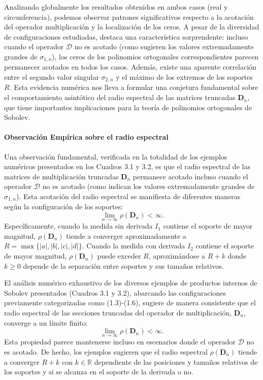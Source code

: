 Analizando globalmente los resultados obtenidos en ambos casos (real y circunferencia), podemos observar patrones significativos respecto a la acotación del operador multiplicación y la localización de los ceros. A pesar de la diversidad de configuraciones estudiadas, destaca una característica sorprendente: incluso cuando el operador $\mathcal{D}$ no es acotado (como sugieren los valores extremadamente grandes de $\sigma_{1,n}$), los ceros de los polinomios ortogonales correspondientes parecen permanecer acotados en todos los casos. Además, existe una aparente correlación entre el segundo valor singular $\sigma_{2,n}$ y el máximo de los extremos de los soportes $R$. Esta evidencia numérica nos lleva a formular una conjetura fundamental sobre el comportamiento asintótico del radio espectral de las matrices truncadas $\mathbf{D}_n$, que tiene importantes implicaciones para la teoría de polinomios ortogonales de Sobolev.

\paragraph{Observación Empírica sobre el radio espectral}
Una observación fundamental, verificada en la totalidad de los ejemplos numéricos presentados en los Cuadros 3.1 y 3.2, es que el radio espectral de las matrices de multiplicación truncadas $\mathbf{D}_n$ permanece acotado incluso cuando el operador $\mathcal{D}$ no es acotado (como indican los valores extremadamente grandes de $\sigma_{1,n}$). Esta acotación del radio espectral se manifiesta de diferentes maneras según la configuración de los soportes:
$$
	\lim_{n \to \infty} \rho(\mathbf{D}_n) < \infty.
$$
Específicamente, cuando la medida sin derivada $I_1$ contiene el soporte de mayor magnitud, $\rho(\mathbf{D}_n)$ tiende a converger aproximadamente a $R = \max\{|a|,|b|,|c|,|d|\}$. Cuando la medida con derivada $I_2$ contiene el soporte de mayor magnitud, $\rho(\mathbf{D}_n)$ puede exceder $R$, aproximándose a $R + k$ donde $k \geq 0$ depende de la separación entre soportes y sus tamaños relativos.

\begin{conjetura}
	\label{conj:rho_Dn_bounded}
	El análisis numérico exhaustivo de los diversos ejemplos de productos internos de Sobolev presentados (Cuadros 3.1 y 3.2), abarcando las configuraciones previamente categorizadas como (1.3)-(1.6), sugiere de manera consistente que el radio espectral de las secciones truncadas del operador de multiplicación, $\mathbf{D}_n$, converge a un límite finito:
	$$
		\lim_{n \to \infty} \rho(\mathbf{D}_n) < \infty.
	$$
	Esta propiedad parece mantenerse incluso en escenarios donde el operador $\mathcal{D}$ no es acotado. De hecho, los ejemplos sugieren que el radio espectral $\rho(\mathbf{D}_n)$ tiende a converger $R + k$ con $k \in \mathbb{R}$ dependiente de las posiciones y tamaños relativos de los soportes y si se alcanza en el soporte de la derivada o no.
\end{conjetura}

